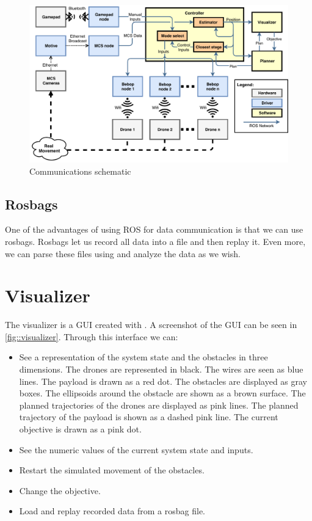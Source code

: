\begin{figure}
	\centering
	\includegraphics[width=1\linewidth]{Figures/Communications}
	\caption{Communications schematic}
	\label{fig::communications}
\end{figure}

\subsection{Rosbags}
One of the advantages of using \ac{ROS} for data communication is that we can use rosbags. Rosbags let us record all data into a file and then replay it. Even more, we can parse these files using  and analyze the data as we wish.

\section{Visualizer}
\label{sect::visualizer}
The visualizer is a \ac{GUI} created with . A screenshot of the \ac{GUI} can be seen in \cref{fig::visualizer}. Through this interface we can:
\begin{itemize}
	\item See a representation of the system state and the obstacles in three dimensions.
		\subitem The drones are represented in black. 
		\subitem The wires are seen as blue lines.
		\subitem The payload is drawn as a red dot.
		\subitem The obstacles are displayed as gray boxes.
		\subitem The ellipsoids around the obstacle are shown as a brown surface.
		\subitem The planned trajectories of the drones are displayed as pink lines.
		\subitem The planned trajectory of the payload is shown as a dashed pink line.
		\subitem The current objective is drawn as a pink dot.
	\item See the numeric values of the current system state and inputs.
	\item Restart the simulated movement of the obstacles.
	\item Change the objective.
	\item Load and replay recorded data from a rosbag file.
\end{itemize}

